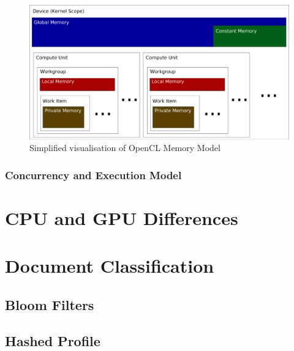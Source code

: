 \begin{figure}[h]
\includegraphics[width=\linewidth]{images/openCLMemoryModel.png}
\caption{Simplified visualisation of OpenCL Memory Model}
\label{fig:openCLMemoryModel}
\end{figure}

\subsubsection{Concurrency and Execution Model}

\section{CPU and GPU Differences}

\section{Document Classification}

\subsection{Bloom Filters}

\subsection{Hashed Profile}

